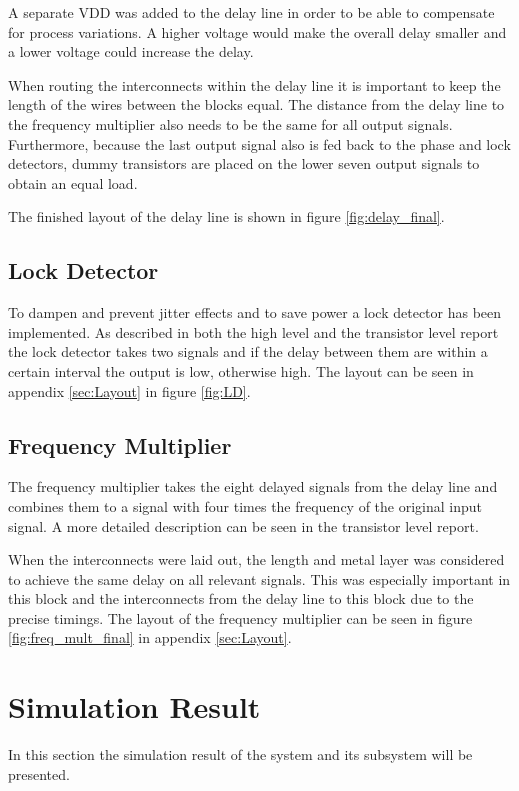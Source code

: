 \documentclass[a4paper,12pt]{article} \usepackage{graphicx}
\begin{document}
A separate VDD was added to the delay line in order to be able to compensate for
process variations. A higher voltage would make the overall delay smaller and a
lower voltage could increase the delay.

When routing the interconnects within the delay line it is important to keep the
length of the wires between the blocks equal. The distance from the delay line
to the frequency multiplier also needs to be the same for all output signals.
Furthermore, because the last output signal also is fed back to the phase and
lock detectors, dummy transistors are placed on the lower seven output signals
to obtain an equal load.

The finished layout of the delay line is shown in figure \ref{fig:delay_final}.

\subsection{Lock Detector}
To dampen and prevent jitter effects and to save power a lock detector
has been implemented. As described in both the high level and the
transistor level report the lock detector takes two signals and if
the delay between them are within a certain interval the output is
low, otherwise high. The layout can be seen in appendix \ref{sec:Layout} in figure \ref{fig:LD}.
\subsection{Frequency Multiplier}
The frequency multiplier takes the eight delayed signals from the delay line and
combines them to a signal with four times the frequency of the original input
signal. A more detailed description can be seen in the transistor level report\cite{transistor}.

When the interconnects were laid out, the length and metal layer was considered
to achieve the same delay on all relevant signals. This was especially important
in this block and the interconnects from the delay line to this block due to
the precise timings. The layout of the frequency multiplier can be seen in
figure \ref{fig:freq_mult_final} in appendix \ref{sec:Layout}.


\section{Simulation Result}
In this section the simulation result of the system and its subsystem will be
presented.
\end{document}
